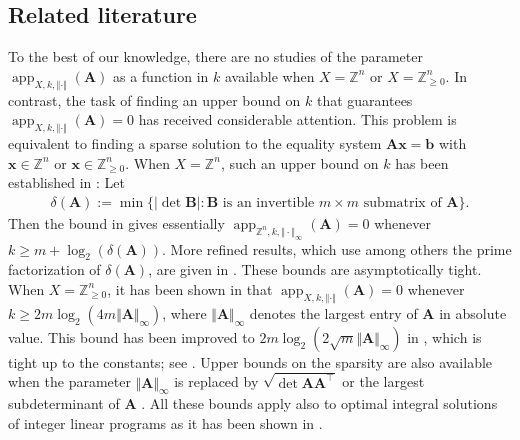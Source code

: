 \documentclass[pdflatex]{sn-jnl}
\DeclareMathOperator{\app}{app}
\newcommand{\Z}{\mathbb{Z}}
\newcommand{\bA}{\bm{A}}
\newcommand{\bx}{\bm{x}}
\newcommand{\bb}{\bm{b}}
\newcommand{\bB}{\bm{B}}
\theoremstyle{thmstyleone}%
\theoremstyle{thmstyletwo}%
\theoremstyle{thmstylethree}%
\begin{document}
	\subsection{Related literature}
	\label{ss_related_literature}
	To the best of our knowledge, there are no studies of the parameter $\app_{X,k,\Vert\cdot\Vert}(\bA)$ as a function in $k$ available when $X = \Z^n$ or $X = \Z^n_{\geq 0}$. 
	In contrast, the task of finding an upper bound on $k$ that guarantees $\app_{X,k,\Vert\cdot\Vert}(\bA) = 0$ has received considerable attention. 
	This problem is equivalent to finding a sparse solution to the equality system $\bA\bx =\bb$ with $\bx\in\Z^n$ or $\bx\in\Z^n_{\geq 0}$. When $X=\Z^n$, such an upper bound on $k$ has been established in \cite[Theorem 1]{alievAverkovLoeraOertel21}: Let
	\begin{align}
		\label{def_small_delta}
		\delta(\bA) := \min\lbrace \left|\det\bB\right| : \bB \text{ is an invertible }m\times m\text{ submatrix of }\bA\rbrace.
	\end{align}
	Then the bound in \cite[Theorem 1]{alievAverkovLoeraOertel21} gives essentially
	$\app_{\Z^n,k,\Vert\cdot\Vert_\infty}(\bA) = 0$ whenever $k \geq m + \log_2(\delta(\bA))$. More refined results, which use among others the prime factorization of $\delta(\bA)$, are given in \cite{alievAverkovLoeraOertel21,DubeyLiu2025}. These bounds are asymptotically tight. 
	When $X =\Z^n_{\geq 0}$, it has been shown in \cite{eisenbrandshmonincaratheodorybounds06} that $\app_{X,k,\Vert\cdot\Vert}(\bA) = 0$ whenever 
	$k \geq 2m\log_2(4m\Vert\bA\Vert_\infty)$, where $\Vert\bA\Vert_\infty$ denotes the largest entry of $\bA$ in absolute value. This bound has been improved to $2m\log_2(2\sqrt{m}\Vert\bA\Vert_\infty)$ in \cite{alievdeloesparelindio2017}, which is tight up to the constants; see \cite{berndt2021new,berndt2024new}.
	Upper bounds on the sparsity are also available when the parameter $\Vert\bA\Vert_\infty$ is replaced by $\sqrt{\det\bA\bA^\top}$ or the largest subdeterminant of $\bA$ \cite{alievAverkovLoeraOertel21,alievdeloesparelindio2017,gribanov2024delta,lee2020improving}. 
	All these bounds apply also to optimal integral solutions of integer linear programs as it has been shown in \cite{alideloeisoerweissupportint2018}.
	
\end{document}
